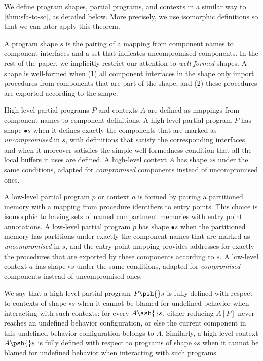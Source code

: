 \documentclass[10pt, conference, compsocconf, letterpaper, times]{IEEEtran}
\begin{document}
\label{sec:instance-defs}

We define program shapes, partial programs, and contexts in a similar
way to \autoref{thm:sfa-to-sc}, as detailed below.
More precisely, we use isomorphic definitions so that we can later
apply this theorem.

A program shape $s$ is the pairing of a mapping from component names
to component interfaces and a set that indicates uncompromised
components.
In the rest of the paper, we implicitly restrict our attention
to \emph{well-formed} shapes.
A shape is well-formed when (1) all component interfaces in the shape
only import procedures from components that are part of the shape, and
(2) these procedures are exported according to the shape.

High-level partial programs $P$ and contexts $A$ are defined as
mappings from component names to component definitions.
A high-level partial program $P$ has shape ${\bullet}s$ when it
defines exactly the components that are marked as \emph{uncompromised}
in $s$, with definitions that satisfy the corresponding interfaces,
and when it moreover satisfies the simple well-formedness condition
that all the local buffers it uses are defined.
A high-level context $A$ has shape ${\circ}s$ under the same
conditions, adapted for \emph{compromised} components instead of
uncompromised ones.

A low-level partial program $p$ or context $a$ is formed by pairing a
partitioned memory with a mapping from procedure identifiers to entry
points.
This choice is isomorphic to having sets of named compartment
memories with entry point annotations.
A low-level partial program $p$ has shape ${\bullet}s$ when the
partitioned memory has partitions under exactly the component names
that are marked as \emph{uncompromised} in $s$, and the entry point
mapping provides addresses for exactly the procedures that are
exported by these components according to $s$.
A low-level context $a$ has shape ${\circ}s$ under the same
conditions, adapted for \emph{compromised} components instead of
uncompromised ones.

We say that a high-level partial program $P \psh{} s$ is fully defined
with respect to contexts of shape ${\circ}s$ when it cannot be blamed
for undefined behavior when interacting with such contexts:
for every $A \ash{} s$, either reducing $A[P]$ never reaches an
undefined behavior configuration, or else the current component in
this undefined behavior configuration belongs to $A$.
Similarly, a high-level context $A \psh{} s$ is fully defined
with respect to programs of shape ${\circ}s$ when it cannot be blamed
for undefined behavior when interacting with such programs.
\end{document}
